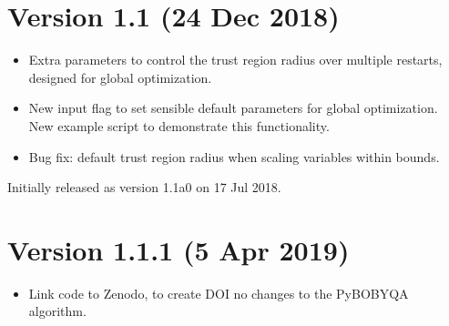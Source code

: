 \documentclass[letterpaper,10pt,english]{sphinxmanual}
\begin{document}
\section{Version 1.1 (24 Dec 2018)}
\label{\detokenize{history:version-1-1-24-dec-2018}}\begin{itemize}
\item {} 
Extra parameters to control the trust region radius over multiple restarts, designed for global optimization.

\item {} 
New input flag  to set sensible default parameters for global optimization. New example script to demonstrate this functionality.

\item {} 
Bug fix: default trust region radius when scaling variables within bounds.

\end{itemize}

Initially released as version 1.1a0 on 17 Jul 2018.


\section{Version 1.1.1 (5 Apr 2019)}
\label{\detokenize{history:version-1-1-1-5-apr-2019}}\begin{itemize}
\item {} 
Link code to Zenodo, to create DOI \sphinxhyphen{} no changes to the Py\sphinxhyphen{}BOBYQA algorithm.

\end{itemize}
\end{document}
